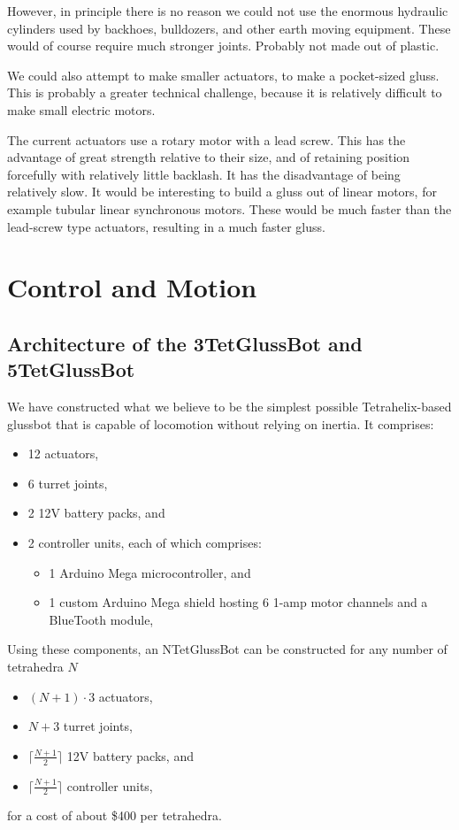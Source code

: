 \documentclass[11pt]{article}
\begin{document}
However, in principle there is no reason we could not use the enormous hydraulic cylinders
used by backhoes, bulldozers, and other earth moving equipment. These would of course require much
stronger joints. Probably not made out of plastic.

We could also attempt to make smaller actuators, to make a pocket-sized gluss. This is probably
a greater technical challenge, because it is relatively difficult to make small electric motors.

The current actuators use a rotary motor with a lead screw. This has the advantage of great
strength relative to their size, and of retaining position forcefully with relatively little backlash. It has the disadvantage
of being relatively slow. It would be interesting to build a gluss out of linear motors, for
example tubular linear synchronous motors. These would be much faster than the lead-screw type
actuators, resulting in a much faster gluss. 

\section{Control and Motion}
\subsection{Architecture of the 3TetGlussBot and 5TetGlussBot}

We have constructed what we believe to be the simplest possible Tetrahelix-based glussbot that is capable of locomotion
without relying on inertia.
It comprises:
\begin{itemize}  
\item 12 actuators,
\item 6 turret joints,
\item 2 12V battery packs, and
\item 2 controller units, each of which comprises:
\begin{itemize}  
\item 1 Arduino Mega microcontroller, and
\item 1 custom Arduino Mega shield hosting 6 1-amp motor channels and a BlueTooth module,
\end{itemize}  
\end{itemize}

Using these components, an NTetGlussBot can be constructed for any number of tetrahedra $N$

\begin{itemize}  
\item $(N + 1)\cdot 3$  actuators,
\item $N+3$ turret joints,
\item $\lceil \frac{N + 1}{2} \rceil$ 12V battery packs, and
\item $\lceil \frac{N + 1}{2} \rceil$ controller units,
\end{itemize}
for a cost of about \$400 per tetrahedra.
\end{document}
